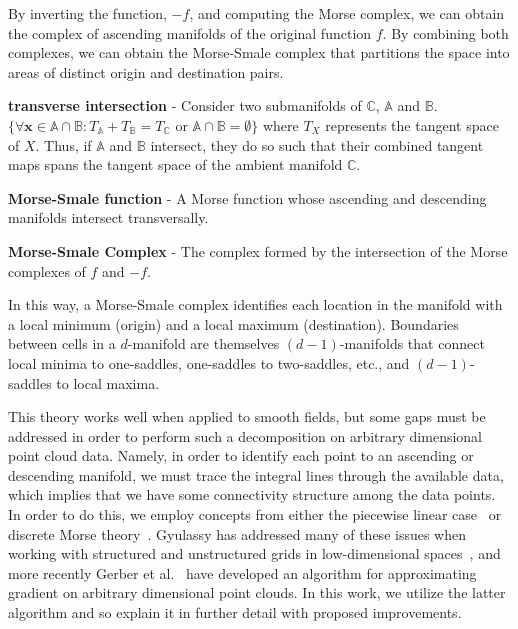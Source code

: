 By inverting the function, $-f$, and computing the Morse complex, we can obtain the complex of ascending manifolds of the original function $f$.
%
By combining both complexes, we can obtain the Morse-Smale complex that partitions the space into areas of distinct origin and destination pairs.


\begin{defn}
\textbf{transverse intersection} - Consider two submanifolds of $\mathbb{C}$, $\mathbb{A}$ and $\mathbb{B}$. $\{\forall \mathbf{x} \in \mathbb{A} \cap \mathbb{B}: T_{\mathbb{A}} + T_{\mathbb{B}} = T_{\mathbb{C}} \text{ or } \mathbb{A} \cap \mathbb{B} = \emptyset\}$ where $T_{X}$ represents the tangent space of $X$.
%
Thus, if $\mathbb{A}$ and $\mathbb{B}$ intersect, they do so such that their combined tangent maps spans the tangent space of the ambient manifold $\mathbb{C}$.
\end{defn}

\begin{defn}
\textbf{Morse-Smale function} - A Morse function whose ascending and descending manifolds intersect transversally.
\end{defn}

\begin{defn}
\textbf{Morse-Smale Complex} - The complex formed by the intersection of the Morse complexes of $f$ and $-f$.
\end{defn}

In this way, a Morse-Smale complex identifies each location in the manifold with a local minimum (origin) and a local maximum (destination).
%
Boundaries between cells in a $d$-manifold are themselves $(d-1)$-manifolds that connect local minima to one-saddles, one-saddles to two-saddles, etc., and $(d-1)$-saddles to local maxima.


This theory works well when applied to smooth fields, but some gaps must be addressed in order to perform such a decomposition on arbitrary dimensional point cloud data.
%
Namely, in order to identify each point to an ascending or descending manifold, we must trace the integral lines through the available data, which implies that we have some connectivity structure among the data points.
%
In order to do this, we employ concepts from either the piecewise linear case~\cite{EdelsbrunnerLetscherZomorodian2002} or discrete Morse theory~\cite{Forman2002}.
%
Gyulassy has addressed many of these issues when working with structured and unstructured grids in low-dimensional spaces~\cite{Gyulassy2008}, and more recently Gerber et al.~\cite{GerberBremerPascucci2010} have developed an algorithm for approximating gradient on arbitrary dimensional point clouds.
%
In this work, we utilize the latter algorithm and so explain it in further detail with proposed improvements.


